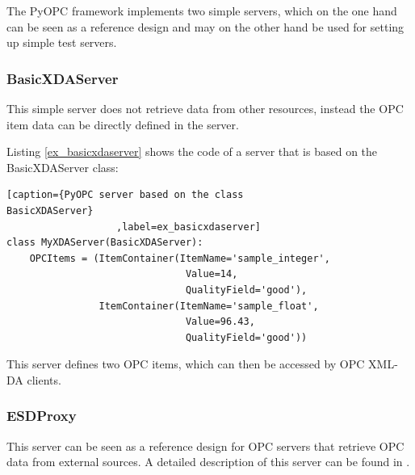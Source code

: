 The PyOPC framework implements two simple servers, which on the one
hand can be seen as a reference design and may on the other hand be
used for setting up simple test servers.

\subsubsection*{BasicXDAServer}

This simple server does not retrieve data from other resources,
instead the OPC item data can be directly defined in the server.

Listing \ref{ex_basicxdaserver} shows the code of a server that is
based on the BasicXDAServer class:

\lstset{language=C}
\begin{lstlisting}[caption={PyOPC server based on the class 
BasicXDAServer}
                   ,label=ex_basicxdaserver] 
class MyXDAServer(BasicXDAServer):
    OPCItems = (ItemContainer(ItemName='sample_integer',
                               Value=14,
                               QualityField='good'),
                ItemContainer(ItemName='sample_float',
                               Value=96.43,
                               QualityField='good'))
\end{lstlisting}

This server defines two OPC items, which can then be accessed
by OPC XML-DA clients.

\subsubsection*{ESDProxy}

This server can be seen as a reference design for OPC servers that
retrieve OPC data from external sources. A detailed description of
this server can be found in \cite{diplomarbeit}.